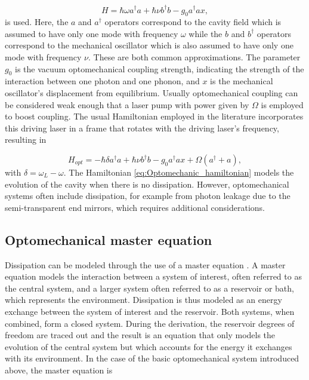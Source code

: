 \documentclass[12pt]{article}
\begin{document}
\begin{equation}\label{eq:basic_hamiltonian}
    H=\hbar \omega a^\dagger a + \hbar\nu b^\dagger b - g_0 a^\dagger a x,
\end{equation}  is used. Here, the $a$ and $a^\dagger$ operators correspond to the cavity field which is assumed to have only one mode with frequency $\omega$ while the $b$ and $b^\dagger$ operators correspond to the mechanical oscillator which is also assumed to have only one mode with frequency $\nu$. These are both common approximations.  The parameter $g_0$ is the vacuum optomechanical coupling strength, indicating the strength of the interaction between one photon and one phonon, and $x$ is the mechanical oscillator's displacement from equilibrium.  Usually optomechanical coupling can be considered weak enough that a laser pump with power given by $\Omega$ is employed to boost coupling. The usual Hamiltonian employed in the literature incorporates this driving laser in a frame that rotates with the driving laser's frequency, resulting in

\begin{equation}\label{eq:Optomechanic_hamiltonian}
    H_{opt}=-\hbar \delta a^\dagger a + \hbar\nu b^\dagger b - g_0 a^\dagger a x + \Omega(a^\dagger+a),
\end{equation} with $\delta = \omega_L-\omega$. The Hamiltonian \eqref{eq:Optomechanic_hamiltonian} models the evolution of the cavity when there is no dissipation. However, optomechanical systems often include dissipation, for example from photon leakage due to the semi-transparent end mirrors, which requires additional considerations.

\subsection{Optomechanical master equation}

Dissipation can be modeled through the use of a master equation \cite{CarmichaelQuantumOptics1999}. A master equation models the interaction between a system of interest, often referred to as the central system, and a larger system often referred to as a reservoir or bath, which represents the environment. Dissipation is thus modeled as an energy exchange between the system of interest and the reservoir. Both systems, when combined, form a closed system. During the derivation, the reservoir degrees of freedom are traced out and the result is an equation that only models the evolution of the central system but which accounts for the energy it exchanges with its environment. In the case of the basic optomechanical system introduced above, the master equation is
\end{document}
